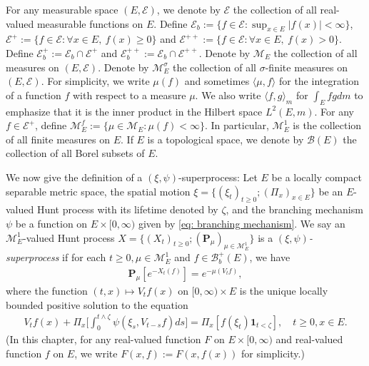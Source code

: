 \documentclass[UTF8]{pkuthss}
\theoremstyle{plain}
\theoremstyle{definition}
\numberwithin{equation}{section}
\begin{document}
	For any measurable space $(E,\mathscr E)$, we denote by $\mathscr E$ the collection of all real-valued measurable functions on $E$.
	Define $\mathscr E_b :=\{f \in \mathscr E: \sup_{x\in E}|f(x)|<\infty \}$, $\mathscr E^+ :=\{f\in \mathscr E: \forall x\in E,~f(x)\geq 0\}$ and $\mathscr E^{++} :=\{f\in \mathscr E: \forall x\in E,~f(x)> 0\}$.
	Define $\mathscr E^+_b := \mathscr E_b \cap \mathscr E^+$ and $\mathscr E^{++}_b:= \mathscr E_b \cap \mathscr E^{++}$.
	Denote by $\mathcal M_E$ the collection of all measures on $(E,\mathscr E)$.
	Denote by $\mathcal M^\sigma_E$ the collection of all  $\sigma$-finite measures on $(E,\mathscr E)$.
	For simplicity, we write $\mu(f)$ and sometimes $\langle \mu, f\rangle$ for the integration of a function $f$ with respect to a measure $\mu$.
    We also write $\langle f, g\rangle_m$ for $\int_E fg dm$ to emphasize that it is the inner product in the Hilbert space $L^2(E, m)$.
	For any $f \in \mathscr E^+$, define $\mathcal M^f_E:= \{\mu \in \mathcal M_E: \mu(f) < \infty\}$.
	In particular, $\mathcal M^1_E$ is the collection of all  finite measures on $E$.
	If $E$ is a topological space, we denote by $\mathscr B(E)$ the collection of all  Borel subsets of $E$.
	
	We now give the definition of a $(\xi, \psi)$-superprocess:
	Let $E$ be a locally compact separable metric space, the spatial motion $\xi=\{(\xi_t)_{t\geq 0};(\Pi_x)_{x\in E}\}$ be an $E$-valued Hunt process with its lifetime denoted by $\zeta$, and the branching mechanism $\psi$ be a function on $E\times[0,\infty)$ given by \eqref{eq: branching mechanism}.
	We say an $\mathcal M^1_E$-valued Hunt process $X=\{(X_t)_{t\geq 0}; (\mathbf P_\mu)_{\mu \in \mathcal M^1_E}\}$ is a \emph{$(\xi,\psi)$-superprocess} if for each $t\geq 0, \mu \in \mathcal M_E^1$ and  $f\in \mathscr B^+_b(E)$, we have
\begin{align}
	\mathbf P_\mu [e^{-X_t(f)}] = e^{-\mu(V_tf)},
\end{align}
	where the function $(t,x) \mapsto V_tf(x)$ on $[0,\infty) \times E$ is the unique locally bounded positive solution to the equation
\begin{align}\label{eq: chap 5 FKPP_in_definition}
	V_t f(x) + \Pi_x \Big[  \int_0^{t\wedge \zeta} \psi (\xi_s,V_{t-s} f) ds \Big]
	= \Pi_x [ f(\xi_t)\mathbf 1_{t<\zeta} ],
	\quad t \geq 0, x \in E.
\end{align}
	(In this chapter, for any real-valued function $F$ on $E\times [0,\infty)$ and real-valued function $f$ on $E$, we write $F(x,f):= F(x,f(x))$ for simplicity.)
\end{document}
